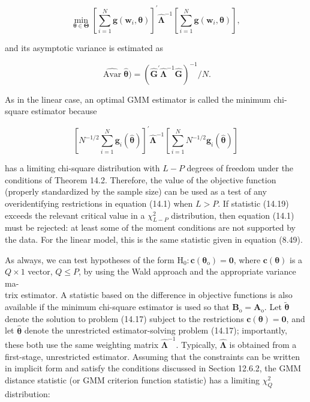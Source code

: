 \documentclass[10pt]{article}
\begin{document}
\begin{equation*}
\min _{\boldsymbol{\theta} \in \boldsymbol{\Theta}}\left[\sum_{i=1}^{N} \mathbf{g}\left(\mathbf{w}_{i}, \boldsymbol{\theta}\right)\right]^{\prime} \hat{\boldsymbol{\Lambda}}^{-1}\left[\sum_{i=1}^{N} \mathbf{g}\left(\mathbf{w}_{i}, \boldsymbol{\theta}\right)\right], \tag{14.17}
\end{equation*}


and its asymptotic variance is estimated as


\begin{equation*}
\widehat{\operatorname{Avar}} \widehat{\boldsymbol{\theta}})=\left(\hat{\mathbf{G}}^{\prime} \hat{\boldsymbol{\Lambda}}^{-1} \hat{\mathbf{G}}\right)^{-1} / N . \tag{14.18}
\end{equation*}


As in the linear case, an optimal GMM estimator is called the minimum chi-square estimator because


\begin{equation*}
\left[N^{-1 / 2} \sum_{i=1}^{N} \mathbf{g}_{i}(\hat{\boldsymbol{\theta}})\right]^{\prime} \hat{\boldsymbol{\Lambda}}^{-1}\left[\sum_{i=1}^{N} N^{-1 / 2} \mathbf{g}_{i}(\hat{\boldsymbol{\theta}})\right] \tag{14.19}
\end{equation*}


has a limiting chi-square distribution with $L-P$ degrees of freedom under the conditions of Theorem 14.2. Therefore, the value of the objective function (properly standardized by the sample size) can be used as a test of any overidentifying restrictions in equation (14.1) when $L>P$. If statistic (14.19) exceeds the relevant critical value in a $\chi_{L-P}^{2}$ distribution, then equation (14.1) must be rejected: at least some of the moment conditions are not supported by the data. For the linear model, this is the same statistic given in equation (8.49).

As always, we can test hypotheses of the form $\mathrm{H}_{0}: \mathbf{c}\left(\boldsymbol{\theta}_{\mathrm{o}}\right)=\mathbf{0}$, where $\mathbf{c}(\boldsymbol{\theta})$ is a $Q \times 1$ vector, $Q \leq P$, by using the Wald approach and the appropriate variance ma-\\
trix estimator. A statistic based on the difference in objective functions is also available if the minimum chi-square estimator is used so that $\mathbf{B}_{\mathrm{o}}=\mathbf{A}_{\mathrm{o}}$. Let $\tilde{\boldsymbol{\theta}}$ denote the solution to problem (14.17) subject to the restrictions $\mathbf{c}(\boldsymbol{\theta})=\mathbf{0}$, and let $\hat{\boldsymbol{\theta}}$ denote the unrestricted estimator-solving problem (14.17); importantly, these both use the same weighting matrix $\hat{\boldsymbol{\Lambda}}^{-1}$. Typically, $\hat{\boldsymbol{\Lambda}}$ is obtained from a first-stage, unrestricted estimator. Assuming that the constraints can be written in implicit form and satisfy the conditions discussed in Section 12.6.2, the GMM distance statistic (or GMM criterion function statistic) has a limiting $\chi_{Q}^{2}$ distribution:
\end{document}
